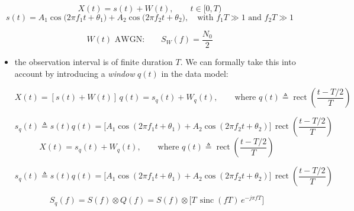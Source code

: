 \[
X(t) = s(t) + W(t), \qquad t \in [0,T)
\]
\[
s(t) = A_{1} \cos\bigl(2\pi f_{1} t + \theta_{1}\bigr)
      + A_{2} \cos\bigl(2\pi f_{2} t + \theta_{2}\bigr),
\quad \text{with } f_{1}T \gg 1 \text{ and } f_{2}T \gg 1
\]

\[
W(t) \text{ AWGN:} \qquad S_{W}(f) = \frac{N_{0}}{2}
\]
\begin{itemize}
   
    \item the observation interval is of finite duration \(T\). We can formally take this into account by introducing a \textit{window} \(q(t)\) in the data model:

    \[
X(t) = [s(t) + W(t)]\,q(t) = s_q(t) + W_q(t),
\qquad
\text{where } q(t) \triangleq \operatorname{rect}\!\left(\frac{t - T/2}{T}\right)
\]

\[
s_q(t) \triangleq s(t) q(t)
= \bigl[A_{1}\cos(2\pi f_{1} t + \theta_{1})
       + A_{2}\cos(2\pi f_{2} t + \theta_{2})\bigr]\,
  \operatorname{rect}\!\left(\frac{t - T/2}{T}\right)
\]
\[
X(t) = s_q(t) + W_q(t), 
\qquad \text{where } q(t) \triangleq \operatorname{rect}\!\left(\frac{t - T/2}{T}\right)
\]

\[
s_q(t) \triangleq s(t) q(t)
= \bigl[A_{1}\cos(2\pi f_{1} t + \theta_{1})
       + A_{2}\cos(2\pi f_{2} t + \theta_{2})\bigr]\,
  \operatorname{rect}\!\left(\frac{t - T/2}{T}\right)
\]

\[
S_q(f) = S(f) \otimes Q(f)
       = S(f) \otimes \bigl[T\,\operatorname{sinc}(fT)\,e^{-j\pi fT}\bigr]
\]


\end{itemize}
